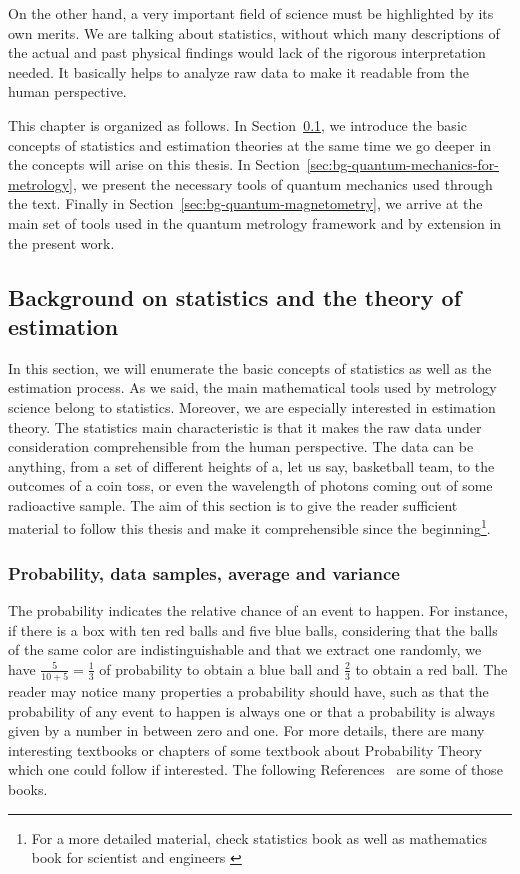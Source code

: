 On the other hand, a very important field of science must be highlighted by its own merits.
We are talking about statistics, without which many descriptions of the actual and past physical findings would lack of the rigorous interpretation needed.
It basically helps to analyze raw data to make it readable from the human perspective.

This chapter is organized as follows.
In Section~\ref{sec:bg-statistics-and-stimation}, we introduce the basic concepts of statistics and estimation theories at the same time we go deeper in the concepts will arise on this thesis.
In Section~\ref{sec:bg-quantum-mechanics-for-metrology}, we present the necessary tools of quantum mechanics used through the text.
Finally in Section~\ref{sec:bg-quantum-magnetometry}, we arrive at the main set of tools used in the quantum metrology framework and by extension in the present work.

\subsection{Background on statistics and the theory of estimation}
\label{sec:bg-statistics-and-stimation}

In this section, we will enumerate the basic concepts of statistics as well as the estimation process.
As we said, the main mathematical tools used by metrology science belong to statistics.
Moreover, we are especially interested in estimation theory.
The statistics main characteristic is that it makes the raw data under consideration comprehensible from the human perspective.
The data can be anything, from a set of different heights of a, let us say, basketball team, to the outcomes of a coin toss, or even the wavelength of photons coming out of some radioactive sample.
The aim of this section is to give the reader sufficient material to follow this thesis and make it comprehensible since the beginning\footnote{
For a more detailed material, check statistics book as well as mathematics book for scientist and engineers \citep{Riley1998, BarlowXXXX}}.

\subsubsection{Probability, data samples, average and variance}

The probability indicates the relative chance of an event to happen.
For instance, if there is a box with ten red balls and five blue balls, considering that the balls of the same color are indistinguishable and that we extract one randomly, we have $\frac{5}{10+5}=\frac{1}{3}$ of probability to obtain a blue ball and $\frac{2}{3}$ to obtain a red ball.
The reader may notice many properties a probability should have, such as that the probability of any event to happen is always one or that a probability is always given by a number in between zero and one.
For more details, there are many interesting textbooks or chapters of some textbook about Probability Theory which one could follow if interested.
The following References~\citep{Riley1998, BarlowXXXX} are some of those books.


